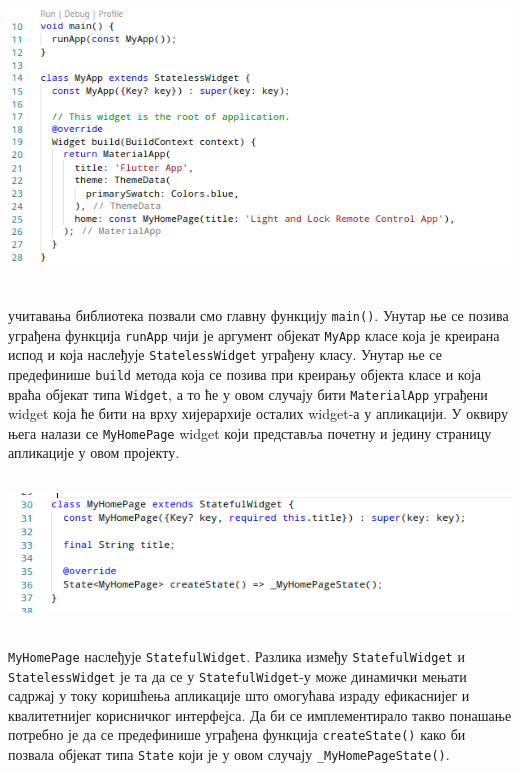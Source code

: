 \documentclass[12pt]{article}
\begin{document}
\begin{center}
    \centering 
    \includegraphics[height=8cm, width=14cm]{images/dart2}
\end{center}
\indent{} учитавања библиотека позвали смо главну функцију \texttt{main()}. Унутар ње се позива уграђена функција \texttt{runApp} чији је аргумент објекат \texttt{MyApp} класе која је креирана испод и која наслеђује \texttt{StatelessWidget} уграђену класу. Унутар ње се предефинише \texttt{build} метода која се позива при креирању објекта класе и која враћа објекат типа \texttt{Widget}, а то ће у овом случају бити \texttt{MaterialApp} уграђени widget која ће бити на врху хијерархије осталих widget-а у апликацији. У оквиру њега налази се \texttt{MyHomePage} widget који представља почетну и једину страницу апликације у овом пројекту. 
\vspace{0.3cm}
\begin{center}
    \centering 
    \includegraphics[height=4cm, width=14cm]{images/dart3}
\end{center}
\indent{} \texttt{MyHomePage} наслеђује \texttt{StatefulWidget}. Разлика између \texttt{StatefulWidget} и \texttt{StatelessWidget} је та да се у \texttt{StatefulWidget}-у може динамички мењати садржај у току коришћења апликације што омогућава израду ефикаснијег и квалитетнијег корисничког интерфејса. Да би се имплементирало такво понашање потребно је да се предефинише уграђена функција \texttt{createState()} како би позвала објекат типа \texttt{State} који је у овом случају \texttt{\_MyHomePageState()}.
\end{document}
